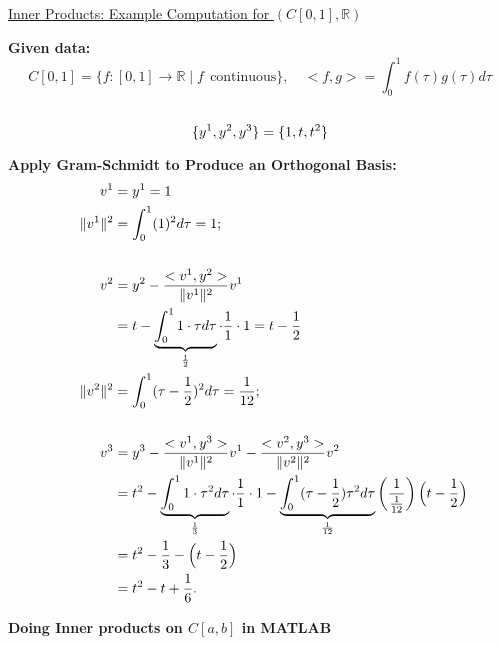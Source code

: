 \documentclass[11pt,twoside]{nsf_jwg}
\newcommand{\RR}{{\mathbb{R}}}
\begin{document}
\newpage

\underline{Inner Products: Example Computation for $(C[0,1],\RR)$}

\textbf{Given data:}\\
	$$C[0,1] = \{ f:[0,1] \rightarrow \RR \mid f~~\mbox{continuous} \},\quad
		<f,g> = \int_0^1 f(\tau) g(\tau) d\tau$$ \\
	$$\{ y^1, y^2, y^3 \} = \{ 1, t, t^2 \} \\$$

\vspace*{1cm}

\textbf{Apply Gram-Schmidt to Produce an Orthogonal Basis:}\\
	\begin{align*}
		v^1 &= y^1 = 1\\
		\qquad \| v^1 \|^2 &= \int_0^1 (1)^2 d\tau = 1 ;\\
		\\
		v^2	&= y^2 - \frac{<v^1,y^2>}{\| v^1 \|^2} v^1 \\
		&= t - \underbrace{%
			\int_0^1 1 \cdot \tau d\tau%
			}_{\frac{1}{2}} \cdot \frac{1}{1} \cdot 1
		= t - \frac{1}{2} \\
		\| v^2 \|^2 &= \int_0^1 (\tau - \frac{1}{2})^2 d\tau = \frac{1}{12} ;\\
		\\
		v^3	&= y^3 - \frac{<v^1,y^3>}{\| v^1 \|^2} v^1
		- \frac{<v^2,y^3>}{\| v^2 \|^2} v^2 \\
		&= t^2 - \underbrace{%
			\int_0^1 1 \cdot \tau^2 d\tau%
			}_{\frac{1}{3}} \cdot \frac{1}{1} \cdot 1
		- \underbrace{%
			\int_0^1 (\tau - \frac{1}{2}) \tau^2 d\tau%
			}_{\frac{1}{12}} \left( \frac{1}{\frac{1}{12}} \right)
				\Bigl( t - \frac{1}{2} \Bigr) \\
		&= t^2 - \frac{1}{3} - \Bigl( t - \frac{1}{2} \Bigr) \\
		&= t^2 - t + \frac{1}{6}.
	\end{align*}

\newpage
\bigskip
\begin{center}\large\bf
Doing Inner products on $C[a,b]$ in MATLAB
\end{center}
\end{document}
